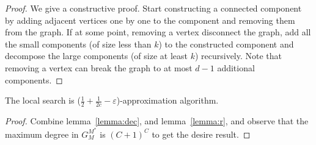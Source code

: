 \begin{proof}
We give a constructive proof.
Start constructing a connected component by adding adjacent vertices
one by one to the component and removing them from the graph.
If at some point, removing a vertex disconnect the graph, add all the small
components (of size less than $k$) to the constructed component and decompose
the large components (of size at least $k$) recursively.
Note that removing a vertex can break the graph to at most $d - 1$ additional
components.
\end{proof}

\begin{theorem}
The local search is ($\frac{1}{2} + \frac{1}{2c} - \varepsilon$)-approximation
algorithm.
\end{theorem}

\begin{proof}
Combine lemma~\ref{lemma:dec}, and lemma~\ref{lemma:r}, 
and observe that the maximum degree in $G^{M^*}_M$ is $(C + 1)^C$ to
get the desire result.
\end{proof}
